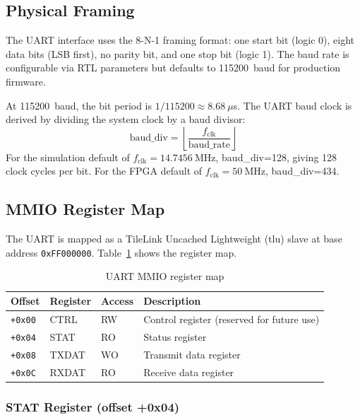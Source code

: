 \subsection{Physical Framing}

The UART interface uses the 8-N-1 framing format: one start bit (logic 0), eight data
bits (LSB first), no parity bit, and one stop bit (logic 1). The baud rate is
configurable via RTL parameters but defaults to 115200~baud for production firmware.

At 115200~baud, the bit period is $1/115200 \approx 8.68~\mu$s. The UART baud clock
is derived by dividing the system clock by a baud divisor:
\begin{equation}
  \text{baud\_div} = \left\lfloor \frac{f_\text{clk}}{\text{baud\_rate}} \right\rfloor
  \label{eq:baud-div}
\end{equation}
For the simulation default of $f_\text{clk} = 14.7456~\text{MHz}$, baud\_div=128,
giving 128 clock cycles per bit. For the FPGA default of $f_\text{clk} = 50~\text{MHz}$,
baud\_div=434.

\subsection{MMIO Register Map}

The UART is mapped as a TileLink Uncached Lightweight (\gls{tlu}) slave at base address
\texttt{0xFF000000}. Table~\ref{tab:uart-regs} shows the register map.

\begin{table}[H]
  \centering
  \caption{UART MMIO register map}
  \label{tab:uart-regs}
  \begin{tabular}{@{}llll@{}}
    \toprule
    \textbf{Offset} & \textbf{Register} & \textbf{Access} & \textbf{Description} \\
    \midrule
    \texttt{+0x00} & CTRL   & RW & Control register (reserved for future use) \\
    \texttt{+0x04} & STAT   & RO & Status register \\
    \texttt{+0x08} & TXDAT  & WO & Transmit data register \\
    \texttt{+0x0C} & RXDAT  & RO & Receive data register \\
    \bottomrule
  \end{tabular}
\end{table}

\subsubsection{STAT Register (offset +0x04)}


